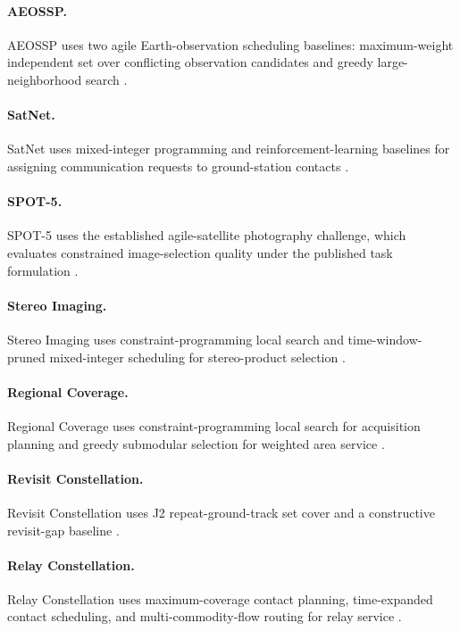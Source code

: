 \documentclass[11pt]{article}
\begin{document}
\paragraph{AEOSSP.}
AEOSSP uses two agile Earth-observation scheduling baselines: maximum-weight independent set over conflicting observation candidates and greedy large-neighborhood search \citep{lemaitrea2002selecting,he2018improved}.

\paragraph{SatNet.}
SatNet uses mixed-integer programming and reinforcement-learning baselines for assigning communication requests to ground-station contacts \citep{goh2021satnet}.

\paragraph{SPOT-5.}
SPOT-5 uses the established agile-satellite photography challenge, which evaluates constrained image-selection quality under the published task formulation \citep{lemaitrea2002selecting}.

\paragraph{Stereo Imaging.}
Stereo Imaging uses constraint-programming local search and time-window-pruned mixed-integer scheduling for stereo-product selection \citep{lemaitrea2002selecting,kim2020task}.

\paragraph{Regional Coverage.}
Regional Coverage uses constraint-programming local search for acquisition planning and greedy submodular selection for weighted area service \citep{antuori2025solving,leskovec2007cost,nemhauser1978analysis,khuller1999budgeted}.

\paragraph{Revisit Constellation.}
Revisit Constellation uses J2 repeat-ground-track set cover and a constructive revisit-gap baseline \citep{lee2024satellite}.

\paragraph{Relay Constellation.}
Relay Constellation uses maximum-coverage contact planning, time-expanded contact scheduling, and multi-commodity-flow routing for relay service \citep{rogers2026optimal,gerard2026contact,grislain2022rethinking,lamothe2023dynamic}.
\end{document}
